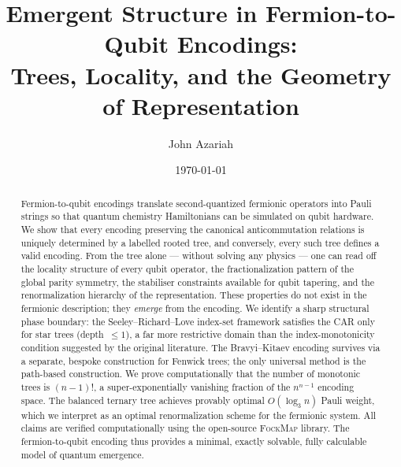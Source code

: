 \documentclass[aps,pra,twocolumn,superscriptaddress,showpacs]{revtex4-2}
\theoremstyle{definition}
\begin{document}
\title{Emergent Structure in Fermion-to-Qubit Encodings:\\
  Trees, Locality, and the Geometry of Representation}

\author{John Azariah}

\date{\today}

\begin{abstract}
Fermion-to-qubit encodings translate second-quantized fermionic
operators into Pauli strings so that quantum chemistry Hamiltonians
can be simulated on qubit hardware.  We show that every encoding
preserving the canonical anticommutation relations is uniquely
determined by a labelled rooted tree, and conversely, every such tree
defines a valid encoding.  From the tree alone --- without solving any
physics --- one can read off the locality structure of every qubit
operator, the fractionalization pattern of the global parity symmetry,
the stabiliser constraints available for qubit tapering, and the
renormalization hierarchy of the representation.  These properties do
not exist in the fermionic description; they \emph{emerge} from the
encoding.  We identify a sharp structural phase boundary: the
Seeley--Richard--Love index-set framework satisfies the CAR only for
star trees (depth~$\le 1$), a far more restrictive domain than the
index-monotonicity condition suggested by the original literature.
The Bravyi--Kitaev encoding survives via a separate, bespoke
construction for Fenwick trees; the only universal method is the
path-based construction.  We prove computationally that the number
of monotonic trees is $(n{-}1)!$, a super-exponentially vanishing
fraction of the $n^{n-1}$ encoding space.  The balanced ternary tree
achieves provably optimal $O(\log_3 n)$ Pauli weight, which we
interpret as an optimal renormalization scheme for the fermionic system.
All claims are verified computationally using the open-source
\textsc{FockMap} library.  The fermion-to-qubit encoding thus provides
a minimal, exactly solvable, fully calculable model of quantum
emergence.
\end{abstract}

\maketitle

\end{document}
